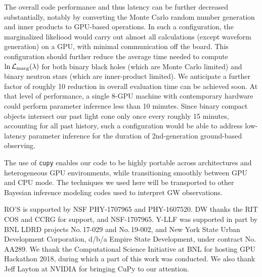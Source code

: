 \documentclass[twocolumn,prd,nofootinbib]{revtex4}
\begin{document}
The overall code performance and thus latency can be further decreased substantially, notably by converting the Monte
Carlo random number generation and inner products to GPU-based operations.  In such a configuration, the marginalized
likeliood would carry out almost all calculations (except waveform generation) on a GPU, with minimal communication off
the board.  This configuration should further reduce the average time needed to compute $\ln {\cal L}_{\rm
  marg}(\lambda)$ for both binary black holes (which are Monte Carlo limited) and binary neutron stars (which are
inner-product limited).   We anticipate a further factor of roughly 10 reduction in overall evaluation time can be
achieved soon.  At that level of performance, a single 8-GPU machine with contemporary hardware could perform parameter inference less than 10
minutes.    Since binary compact objects intersect our past light cone only once every roughly 15 minutes, accounting
for all past history, such a configuration would be able to address low-latency parameter inference for the duration of
2nd-generation ground-based observing.


The use of \texttt{cupy} enables our code to be highly portable across architectures and heterogeneous GPU environments,
while transitioning smoothly between GPU and CPU mode.     The techniques we used here will be transported to other
Bayesian inference modeling codes used to interpret GW observations.





\begin{acknowledgements}
RO'S is supported by NSF PHY-1707965 and PHY-1607520.
DW thanks the RIT COS and CCRG for support, and  NSF-1707965.
Y-LLF was supported in part by BNL LDRD projects No.\,17-029 and No.\,19-002, 
and New York State Urban Development Corporation, d/b/a Empire State Development, under contract No.\,AA289.
We thank the Computational Science Initiative at BNL for hosting GPU Hackathon 2018, during which a part of this work was conducted. We also thank Jeff Layton at NVIDIA for bringing CuPy to our attention.
\end{acknowledgements}



\end{document}
